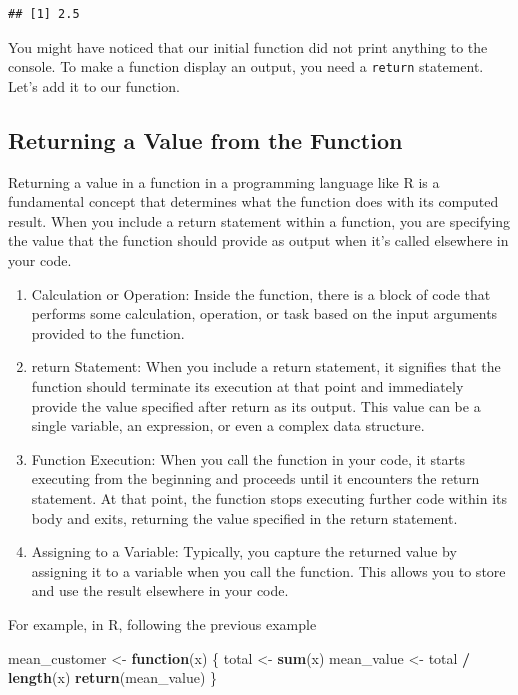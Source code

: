 \documentclass[
]{book}
\newenvironment{Shaded}{\begin{snugshade}}{\end{snugshade}}
\newcommand{\ControlFlowTok}[1]{\textcolor[rgb]{0.13,0.29,0.53}{\textbf{#1}}}
\newcommand{\FunctionTok}[1]{\textcolor[rgb]{0.13,0.29,0.53}{\textbf{#1}}}
\newcommand{\NormalTok}[1]{#1}
\newcommand{\OtherTok}[1]{\textcolor[rgb]{0.56,0.35,0.01}{#1}}
\newcommand{\SpecialCharTok}[1]{\textcolor[rgb]{0.81,0.36,0.00}{\textbf{#1}}}
\begin{document}
\begin{verbatim}
## [1] 2.5
\end{verbatim}

You might have noticed that our initial function did not print anything to the console. To make a function display an output, you need a \texttt{return} statement. Let's add it to our function.

\hypertarget{returning-a-value-from-the-function}{%
\subsection{Returning a Value from the Function}\label{returning-a-value-from-the-function}}

Returning a value in a function in a programming language like R is a fundamental concept that determines what the function does with its computed result. When you include a return statement within a function, you are specifying the value that the function should provide as output when it's called elsewhere in your code.

\begin{enumerate}
\def\labelenumi{\arabic{enumi}.}
\item
  Calculation or Operation: Inside the function, there is a block of code that performs some calculation, operation, or task based on the input arguments provided to the function.
\item
  return Statement: When you include a return statement, it signifies that the function should terminate its execution at that point and immediately provide the value specified after return as its output. This value can be a single variable, an expression, or even a complex data structure.
\item
  Function Execution: When you call the function in your code, it starts executing from the beginning and proceeds until it encounters the return statement. At that point, the function stops executing further code within its body and exits, returning the value specified in the return statement.
\item
  Assigning to a Variable: Typically, you capture the returned value by assigning it to a variable when you call the function. This allows you to store and use the result elsewhere in your code.
\end{enumerate}

For example, in R, following the previous example

\begin{Shaded}
\begin{Highlighting}[]
\NormalTok{mean\_customer }\OtherTok{\textless{}{-}} \ControlFlowTok{function}\NormalTok{(x) \{}
\NormalTok{  total }\OtherTok{\textless{}{-}} \FunctionTok{sum}\NormalTok{(x)}
\NormalTok{  mean\_value }\OtherTok{\textless{}{-}}\NormalTok{ total }\SpecialCharTok{/} \FunctionTok{length}\NormalTok{(x)}
  \FunctionTok{return}\NormalTok{(mean\_value)}
\NormalTok{\}}
\end{Highlighting}
\end{Shaded}
\end{document}
